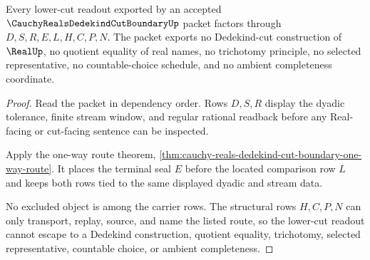 \begin{theorem}
\label{thm:cauchy-reals-dedekind-cut-boundary-nonescape}
Every lower-cut readout exported by an accepted $\CauchyRealsDedekindCutBoundaryUp$ packet factors through $D,S,R,E,L,H,C,P,N$. The packet exports no Dedekind-cut construction of $\RealUp$, no quotient equality of real names, no trichotomy principle, no selected representative, no countable-choice schedule, and no ambient completeness coordinate.
\end{theorem}
\begin{proof}
Read the packet in dependency order. Rows $D,S,R$ display the dyadic tolerance, finite stream window, and regular rational readback before any Real-facing or cut-facing sentence can be inspected.

Apply the one-way route theorem, \autoref{thm:cauchy-reals-dedekind-cut-boundary-one-way-route}. It places the terminal seal $E$ before the located comparison row $L$ and keeps both rows tied to the same displayed dyadic and stream data.

No excluded object is among the carrier rows. The structural rows $H,C,P,N$ can only transport, replay, source, and name the listed route, so the lower-cut readout cannot escape to a Dedekind construction, quotient equality, trichotomy, selected representative, countable choice, or ambient completeness.
\end{proof}




